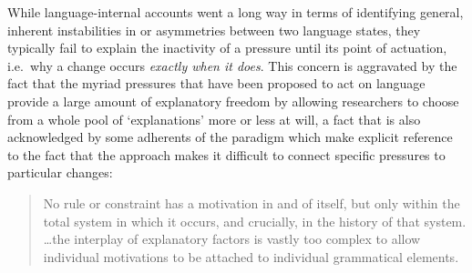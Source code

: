 While language-internal accounts went a long way in terms of identifying general, inherent instabilities in or asymmetries between two language states, they typically fail to explain the inactivity of a pressure until its point of actuation, i.e.~why a change occurs \emph{exactly when it does}. %
This concern is aggravated by the fact that the myriad pressures that have been proposed to act on language provide a large amount of explanatory freedom by allowing researchers to choose from a whole pool of `explanations' more or less at will, a fact that is also acknowledged by some adherents of the paradigm which make explicit reference to the fact that the approach makes it difficult to connect specific pressures to particular changes:

\begin{quote}
No rule or constraint has a motivation in and of itself, but only within the total system in which it occurs, and crucially, in the history of that system. \ldots the interplay of explanatory factors is vastly too complex to allow individual motivations to be attached to individual grammatical elements.~\citep[p.313]{Newmeyer2014}
\end{quote}

